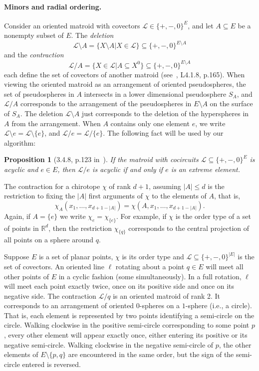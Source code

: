 \documentclass[leqno,12pt]{article}
\def\R{\mathbb{R}}
\def\L{\mathcal{L}}
\newtheorem{proposition}{Proposition}
\begin{document}
\paragraph{Minors and radial ordering.}
Consider an oriented matroid with covectors $\L\in\{+,-,0\}^E$, and
let $A\subseteq E$ be a nonempty subset of $E$. The
\emph{deletion}
$$\L\setminus A = \{X\setminus A | X\in\L\} 
\subseteq \{+,-,0\}^{E\setminus A}$$
and the \emph{contraction}
$$\L/A = \{X\in\L | A\subseteq X^0\}
\subseteq \{+,-,0\}^{E\setminus A}$$
\noindent each define the set of covectors of another matroid 
(see~\cite{Bjorner:Oriented}, L4.1.8,  p.165). 
When viewing the
oriented matroid as an arrangement of oriented pseudospheres, the set
of pseudospheres in $A$ intersects in a lower dimensional pseudosphere
$S_A$, and $\L/A$ corresponds to the arrangement of the
pseudospheres in $E\setminus A$ on the surface of $S_A$.
The deletion $\L\setminus A$ just corresponds to the deletion of the
hyperspheres in $A$ from the arrangement.
When $A$ contains only one element $e$, we write 
$\L\setminus e = \L\setminus\{e\}$, and $\L/e = \L/\{e\}$.
The following fact will be used by our algorithm:
\begin{proposition}[3.4.8,  p.123 in~\cite{Bjorner:Oriented}]
If the matroid with cocircuits $\L\subseteq \{+,-,0\}^E$ is acyclic
and $e\in E$, then $\L/{e}$ is acyclic if and only if $e$ is
an extreme element.
\end{proposition}

The contraction for a chirotope $\chi$ of rank $d{+}1$, assuming
$|A|\leq d$ is the restriction to fixing the $|A|$ first arguments of
$\chi$ to the elements of $A$, that is, 
$$\chi_A(x_1,\ldots,x_{d+1-|A|}) = \chi(A,x_1,\ldots,x_{d+1-|A|}).$$
Again, if $A=\{e\}$ we write $\chi_e = \chi_{\{e\}}$.
For example, if $\chi$ is the order type of a set of points in $\R^d$,
then the restriction $\chi_{\{q\}}$ corresponds to the central projection of
all points on a sphere around $q$.

Suppose $E$ is a set of  planar points, $\chi$ is
its order type and $\L\subseteq \{+,-,0\}^{|E|}$ is the set of
covectors. An oriented line $\ell$ rotating about a point $q\in E$ will meet all
other points of $E$ in a cyclic fashion (some simultaneously). 
In a full rotation, $\ell$
will meet each point exactly twice, once on its positive side and once
on its negative side. The contraction $\L/q$ is an oriented
matroid of rank 2. It corresponds to an arrangement of oriented
0-spheres on a $1$-sphere (i.e., a circle). That is, each element is
represented by two points identifying a semi-circle on the
circle. Walking clockwise in the positive semi-circle corresponding to
some point $p$, every other element will appear exactly once, either
entering its positive or its negative semi-circle. Walking
clockwise in the negative semi-circle of $p$, the other elements of
$E\setminus\{p,q\}$ are encountered in the same order, but the sign of the semi-circle
entered is reversed.
\end{document}
